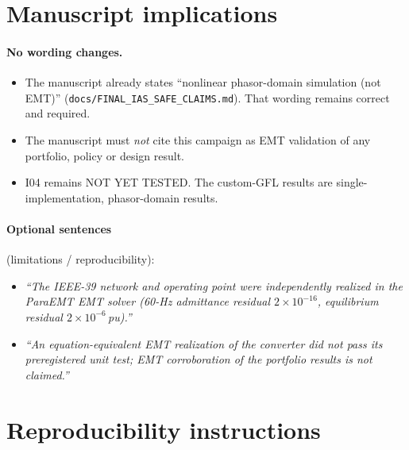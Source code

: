 \documentclass[10pt,a4paper]{article}
\newcommand{\f}[1]{\nolinkurl{#1}}
\begin{document}
\section{Manuscript implications}

\paragraph{No wording changes.}
\begin{itemize}
\item The manuscript already states ``nonlinear phasor-domain simulation (not
  EMT)'' (\f{docs/FINAL_IAS_SAFE_CLAIMS.md}). That wording remains correct and
  required.
\item The manuscript must \emph{not} cite this campaign as EMT validation of
  any portfolio, policy or design result.
\item I04 remains NOT YET TESTED. The custom-GFL results are
  single-implementation, phasor-domain results.
\end{itemize}

\paragraph{Optional sentences} (limitations / reproducibility):
\begin{itemize}
\item \emph{``The IEEE-39 network and operating point were independently
  realized in the ParaEMT EMT solver (60-Hz admittance residual
  $2\times10^{-16}$, equilibrium residual $2\times10^{-6}$\,pu).''}
\item \emph{``An equation-equivalent EMT realization of the converter did not
  pass its preregistered unit test; EMT corroboration of the portfolio results
  is not claimed.''}
\end{itemize}

\section{Reproducibility instructions}
\end{document}

